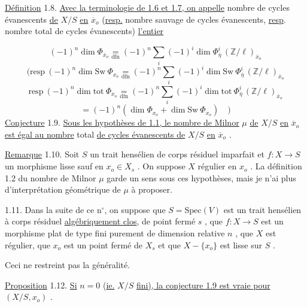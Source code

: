 \underline{Définition} 1.8. \underline{Avec la terminologie de 1.6 et 1.7, on appelle} nombre de cycles évanescents \underline{de} $X/S$ \underline{en} $\overline{x}_o$ (\underline{resp.} nombre sauvage de cycles évanescents, \underline{resp}. nombre total de cycles évanescents) \underline{l'entier}

\begin{equation*}
(-1)^n \dim \Phi_{\overline{x}_o} \underset{\mathrm{dfn}}{=} (-1)^n \sum_i (-1)^i \dim \Phi^i_{\overline{\eta}} \, (\mathbb{Z}/\ell)_{\overline{x}_o}
\end{equation*}
\begin{equation*}
(\mathrm{resp} \ (-1)^n \dim \mathrm{Sw} \ \Phi_{x_o} \underset{\mathrm{dfn}}{=} (-1)^n \sum_i (-1)^i \dim \mathrm{Sw} \ \Phi^i_{\overline{\eta}} \, (\mathbb{Z}/\ell)_{\overline{x}_o}
\end{equation*}
\begin{equation*}
\mathrm{resp} \ (-1)^n \dim \mathrm{tot} \ \Phi_{x_o} \underset{\mathrm{dfn}}{=} (-1)^n \sum_i (-1)^i \dim \mathrm{tot} \ \Phi^i_{\overline{\eta}} \, (\mathbb{Z}/\ell)_{\overline{x}_o}
\end{equation*}
\begin{equation*}
= (-1)^n(\dim \Phi_{x_o} + \dim \mathrm{Sw} \ \Phi_{x_o} ) \quad )
\end{equation*}
\underline{Conjecture} 1.9. \underline{Sous les hypothèses de 1.1, le nombre de Milnor} $\mu$ \underline{de} $X/S$ \underline{en} $\overline{x}_o$ \underline{est égal au nombre} total \underline{de cycles évanescents de} $X/S$ \underline{en} $\overline{x}_o$ .

\underline{Remarque} 1.10. Soit $S$ un trait hensélien de corps résiduel imparfait et $f : X \to S$
un morphisme lisse sauf en $x_o \in X_s$ . On suppose $X$ régulier en $x_o$ . La définition 1.2 du nombre de Milnor $\mu$ garde un sens sous ces hypothèses, mais je n'ai plus d'interprétation géométrique de $\mu$ à proposer.

1.11. Dans la suite de ce n$^{\circ}$, on suppose que $S = \mathrm{Spec}(V)$ est un trait hensélien à corps résiduel \underline{algébriquement clos}, de point fermé $s$ , que $f : X \to S$ est un morphisme plat de type fini purement de dimension relative $n$ , que $X$ est régulier, que $x_o$ est un point fermé de $X_s$ et que $X - \{x_o\}$ est lisse sur $S$ .

Ceci ne restreint pas la généralité.

\underline{Proposition} 1.12. \underline{Si} $n = 0$ (\underline{ie.} $X/S$ \underline{fini), la conjecture 1.9 est vraie pour} $(X/S,x_o)$ .

